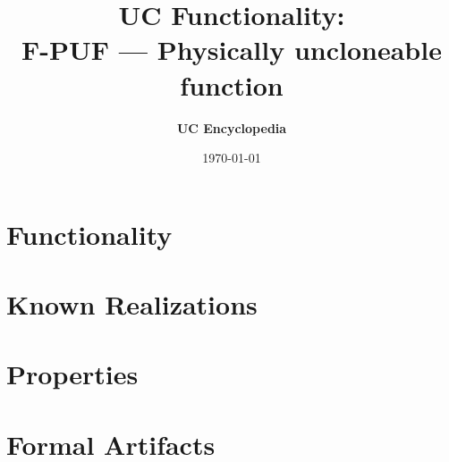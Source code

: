\documentclass[11pt,a4paper]{article}
\title{\textbf{\Large UC Functionality:}\\[0.2em] \Large F-PUF --- Physically uncloneable function}
\author{\textbf{UC Encyclopedia}}
\date{\today}
\newtheorem{functionality}{Functionality}
\begin{document}
\maketitle

\begin{abstract}
\end{abstract}

\section{Functionality}

%

\section{Known Realizations}


\section{Properties}


\section{Formal Artifacts}

\end{document}
